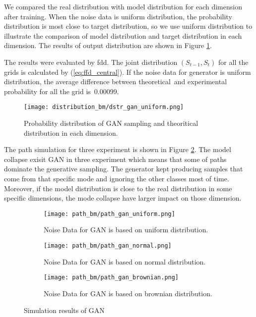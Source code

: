 \documentclass{article}
\begin{document}
	
	We compared the real distribution with model distribution for each dimension after training. 
	When the noise data is uniform distribution, the probability distribution is most close to target distribution, so we use uniform distribution to illustrate the comparison of model distribution and target distribution in each dimension. 
	The results of output distribution are shown in Figure \ref{fig:dstr_gan_uniform}.
	
	The results were evaluated by fdd. The joint distribution $(S_{t-1},S_{t})$ for all the grids is calculated by (\ref{eq:ffd_central}). 
	If the noise data for generator is uniform distribution, the average difference between theoretical and experimental probability for all the grid is 0.00099.
	
	
	\begin{figure}[h]
		\centering
		\texttt{[image: distribution\_bm/dstr\_gan\_uniform.png]}
		\caption{Probability distribution of GAN sampling and theoritical distribution in each dimension.}
		\label{fig:dstr_gan_uniform}
	\end{figure}
	
		
	The path simulation for three experiment is shown in Figure \ref{fig:path_gan}. 
	The model collapse exisit GAN in three experiment which means that some of paths dominate the generative sampling.
	The generator kept producing samples that come from that specific mode and  ignoring the other classes most of time. 
	Moreover, if the model distribution is close to the real distribution in some specific dimensions, the mode collapse have larger impact on those dimension.
	
	\begin{figure}[h]
		\centering
		\begin{subfigure}[b]{0.6\textwidth}
			\texttt{[image: path\_bm/path\_gan\_uniform.png]}
			\caption{Noise Data for GAN is based on uniform distribution.}
		\end{subfigure}
		
			\begin{subfigure}[b]{0.6\textwidth}
			\texttt{[image: path\_bm/path\_gan\_normal.png]}
			\caption{Noise Data for GAN is based on normal distribution.}
		\end{subfigure}

		\begin{subfigure}[b]{0.6\textwidth}
			\texttt{[image: path\_bm/path\_gan\_brownian.png]}
			\caption{Noise Data for GAN is based on brownian distribution.}
		\end{subfigure}
	
	
		\caption{Simulation results of GAN}
		\label{fig:path_gan}
	\end{figure}
\end{document}
